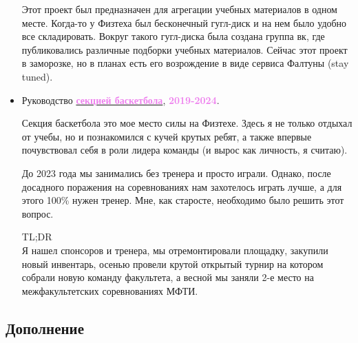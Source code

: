 \documentclass[a4paper,12pt]{article}
\begin{document}
\begin{itemize}
	Этот проект был предназначен для агрегации учебных материалов в одном месте. Когда-то у Физтеха был бесконечный гугл-диск и на нем было удобно все складировать. Вокруг такого гугл-диска была создана группа вк, где публиковались различные подборки учебных материалов. Сейчас этот проект в заморозке, но в планах есть его возрождение в виде сервиса Фалтуны (stay tuned).
	
	\item[\textcolor{violet}{\faHeart}] Руководство \href{https://t.me/falt_basket}{\textcolor{violet}{\textbf{секцией баскетбола}}}, \textcolor{violet}{\textbf{2019-2024}}.
	
	Секция баскетбола это мое место силы на Физтехе. Здесь я не только отдыхал от учебы, но и познакомился с кучей крутых ребят, а также впервые почувствовал себя в роли лидера команды (и вырос как личность, я считаю).
	
	До 2023 года мы занимались без тренера и просто играли. Однако, после досадного поражения на соревнованиях нам захотелось играть лучше, а для этого 100\% нужен тренер. Мне, как старосте, необходимо было решить этот вопрос. 
	
	TL;DR\\ Я нашел спонсоров и тренера, мы отремонтировали площадку, закупили новый инвентарь, осенью провели крутой открытый турнир на котором собрали новую команду факультета, а весной мы заняли 2-е место на межфакультетских соревнованиях МФТИ.
	
	\end{itemize}
	
	
	
	
	\newpage 
	
	\subsection*{Дополнение}
	
\end{document}

